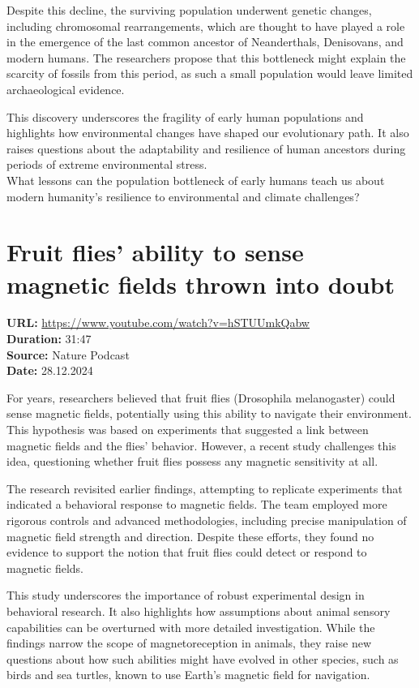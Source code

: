 \documentclass[12pt]{article}
\begin{document}
Despite this decline, the surviving population underwent genetic changes, including chromosomal rearrangements, which are thought to have played a role in the emergence of the last common ancestor of Neanderthals, Denisovans, and modern humans. The researchers propose that this bottleneck might explain the scarcity of fossils from this period, as such a small population would leave limited archaeological evidence.

This discovery underscores the fragility of early human populations and highlights how environmental changes have shaped our evolutionary path. It also raises questions about the adaptability and resilience of human ancestors during periods of extreme environmental stress.\\[5px]


What lessons can the population bottleneck of early humans teach us about modern humanity's resilience to environmental and climate challenges?

\newpage

\section{Fruit flies' ability to sense magnetic fields thrown into doubt}
\textbf{URL:} \url{https://www.youtube.com/watch?v=hSTUUmkQabw}\\
\textbf{Duration:} 31:47\\
\textbf{Source:} Nature Podcast\\
\textbf{Date:} 28.12.2024


For years, researchers believed that fruit flies (Drosophila melanogaster) could sense magnetic fields, potentially using this ability to navigate their environment. This hypothesis was based on experiments that suggested a link between magnetic fields and the flies’ behavior. However, a recent study challenges this idea, questioning whether fruit flies possess any magnetic sensitivity at all.  

The research revisited earlier findings, attempting to replicate experiments that indicated a behavioral response to magnetic fields. The team employed more rigorous controls and advanced methodologies, including precise manipulation of magnetic field strength and direction. Despite these efforts, they found no evidence to support the notion that fruit flies could detect or respond to magnetic fields.  

This study underscores the importance of robust experimental design in behavioral research. It also highlights how assumptions about animal sensory capabilities can be overturned with more detailed investigation. While the findings narrow the scope of magnetoreception in animals, they raise new questions about how such abilities might have evolved in other species, such as birds and sea turtles, known to use Earth's magnetic field for navigation.\\[5px]  
 
\end{document}
